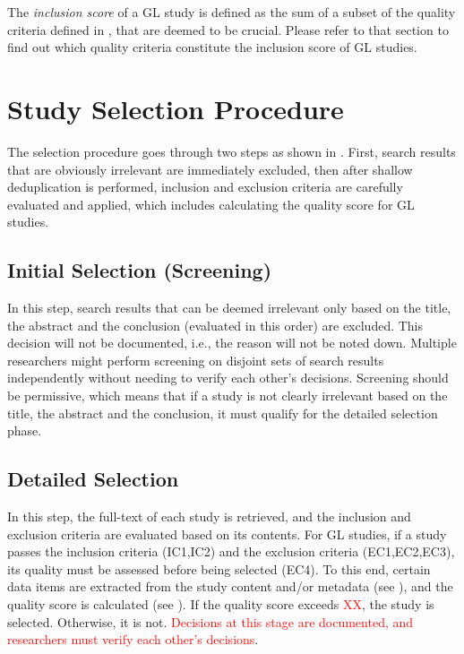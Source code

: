 \documentclass[review]{elsarticle}
\begin{document}
The \textit{inclusion score} of a GL study is defined as the sum of a subset of the quality criteria defined in , that are deemed to be crucial.
Please refer to that section to find out which quality criteria constitute the inclusion score of GL studies.

\section{Study Selection Procedure}
\label{sec:study-selection-procedure}
The selection procedure goes through two steps as shown in .
First, search results that are obviously irrelevant are immediately excluded, then after shallow deduplication is performed, inclusion and exclusion criteria are carefully evaluated and applied, which includes calculating the quality score for GL studies.

\subsection{Initial Selection (Screening)}
In this step, search results that can be deemed irrelevant only based on the title, the abstract and the conclusion (evaluated in this order) are excluded.
This decision will not be documented, i.e., the reason will not be noted down.
Multiple researchers might perform screening on disjoint sets of search results independently without needing to verify each other's decisions.
Screening should be permissive, which means that if a study is not clearly irrelevant based on the title, the abstract and the conclusion, it must qualify for the detailed selection phase.

\subsection{Detailed Selection}
In this step, the full-text of each study is retrieved, and the inclusion and exclusion criteria are evaluated based on its contents.
For GL studies, if a study passes the inclusion criteria (IC1,IC2) and the exclusion criteria (EC1,EC2,EC3), its quality must be assessed before being selected (EC4).
To this end, certain data items are extracted from the study content and/or metadata (see ), and the quality score is calculated (see ).
If the quality score exceeds \textcolor{red}{XX}, the study is selected. 
Otherwise, it is not.
\textcolor{red}{Decisions at this stage are documented, and researchers must verify each other's decisions}.
\end{document}
